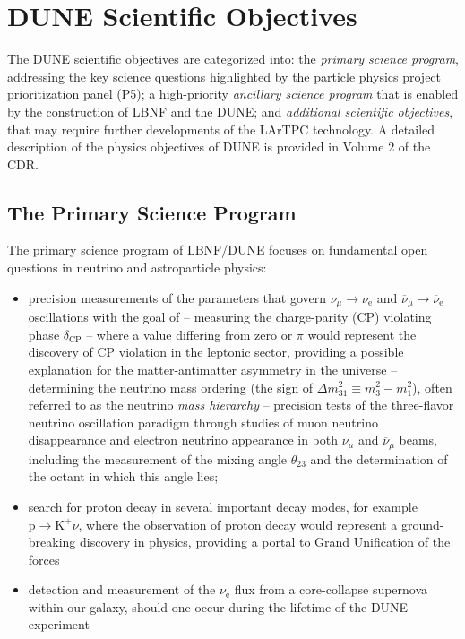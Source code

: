\section{DUNE Scientific Objectives}

The DUNE scientific objectives are categorized into: the \textit{primary science program}, addressing the key science questions 
highlighted by the particle physics project prioritization panel (P5); 
a high-priority \textit{ancillary science program} that is 
enabled by the construction of LBNF and the DUNE; and \textit{additional scientific objectives}, that may require further developments 
of the LArTPC technology. A detailed description of the physics objectives of DUNE is provided in Volume 2 of the CDR.


\subsection{The Primary Science Program}

The primary science program of LBNF/DUNE  focuses on fundamental open questions in neutrino and astroparticle physics: 
\begin{itemize}
  \item precision measurements of the parameters that govern $\nu_{\mu} \rightarrow \nu_\text{e}$ and
           $\overline{\nu}_{\mu} \rightarrow \overline{\nu}_\text{e}$ oscillations with the goal of
  \subitem -- measuring the charge-parity (CP) violating phase $\delta_\text{CP}$ -- where a value differing from zero or $\pi$ would represent the discovery of CP violation in the leptonic sector, providing a possible explanation for the matter-antimatter asymmetry in the universe
  \subitem -- determining the neutrino mass ordering (the sign of $\Delta m^2_{31} \equiv m_3^2-m_1^2$), often referred to as the neutrino \textit{mass hierarchy}
  \subitem -- precision tests of the three-flavor neutrino oscillation paradigm through studies of muon neutrino disappearance 
    and electron neutrino appearance in both $\nu_\mu$ and $\overline{\nu}_{\mu}$ beams, including the 
    measurement of the mixing angle $\theta_{23}$ and the determination of the octant in which this angle lies;
    \item search for proton decay in several important decay modes, for example $\text{p}\rightarrow\text{K}^+\overline{\nu}$, where the observation of proton decay would represent a ground-breaking discovery in physics, providing a portal to Grand Unification of the forces
    \item detection and measurement of the $\nu_\text{e}$ flux from a core-collapse supernova within our galaxy, should one occur during the lifetime of the DUNE experiment
\end{itemize}

